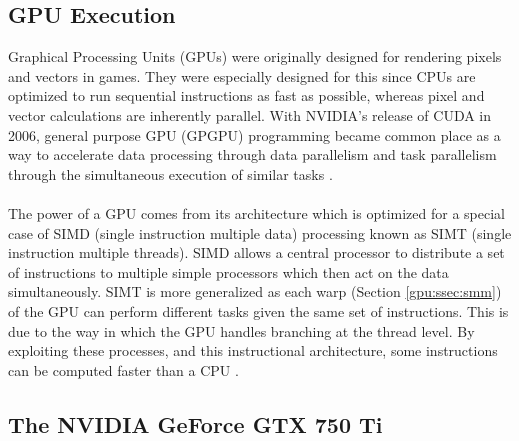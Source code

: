 \subsection{GPU Execution}\label{gpu:sec:opt}
Graphical Processing Units (GPUs) were originally designed for rendering pixels and vectors in games. They were especially designed for this since CPUs are optimized to run sequential instructions as fast as possible, whereas pixel and vector calculations are inherently parallel. With NVIDIA's release of CUDA in 2006, general purpose GPU (GPGPU) programming became common place as a way to accelerate data processing through data parallelism and task parallelism through the simultaneous execution of similar tasks \citep{cuda_home}.
\\
\\
The power of a GPU comes from its architecture which is optimized for a special case of SIMD (single instruction multiple data) processing known as SIMT (single instruction multiple threads). SIMD allows a central processor to distribute a set of instructions to multiple simple processors which then act on the data simultaneously. SIMT is more generalized as each warp (Section \ref{gpu:ssec:smm}) of the GPU can perform different tasks given the same set of instructions. This is due to the way in which the GPU handles branching at the thread level. By exploiting these processes, and this instructional architecture, some instructions can be computed faster than a CPU \citep{vuduc2013brief}.
\subsection{The NVIDIA GeForce GTX 750 Ti}\label{gpu:sec:750}
%
